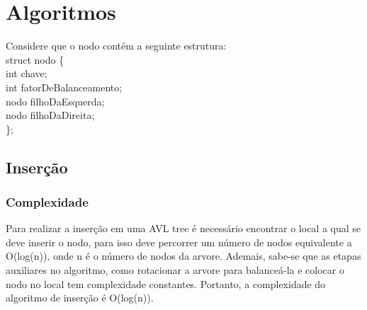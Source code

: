 \documentclass{article}
\begin{document}
\section{Algoritmos}
Considere que o nodo contém a seguinte estrutura: \\
struct nodo \{ \\
\indent int chave; \\
\indent int fatorDeBalanceamento; \\
\indent nodo filhoDaEsquerda; \\
\indent nodo filhoDaDireita; \\
\}; \\
\subsection{Inserção}
\subsubsection{Complexidade}
\leavevmode
\indent Para realizar a inserção em uma AVL tree é necessário encontrar o local a qual se 
deve inserir o nodo, para isso deve percorrer um número de nodos equivalente a O(log(n)), 
onde n é o número de nodos da arvore. Ademais, sabe-se que as etapas auxiliares no algoritmo, 
como rotacionar a arvore para balanceá-la e colocar o nodo no local tem complexidade constantes.
Portanto, a complexidade do algoritmo de inserção é O(log(n)).
\end{document}
